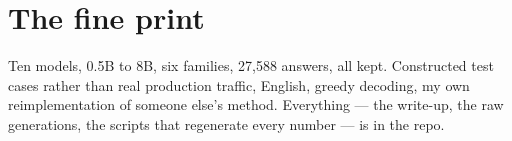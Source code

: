 \documentclass[11pt,a4paper]{article}
\begin{document}
\section*{The fine print}

Ten models, 0.5B to 8B, six families, 27{,}588 answers, all kept. Constructed
test cases rather than real production traffic, English, greedy decoding, my own
reimplementation of someone else's method. Everything --- the write-up, the raw
generations, the scripts that regenerate every number --- is in the repo.
\end{document}
